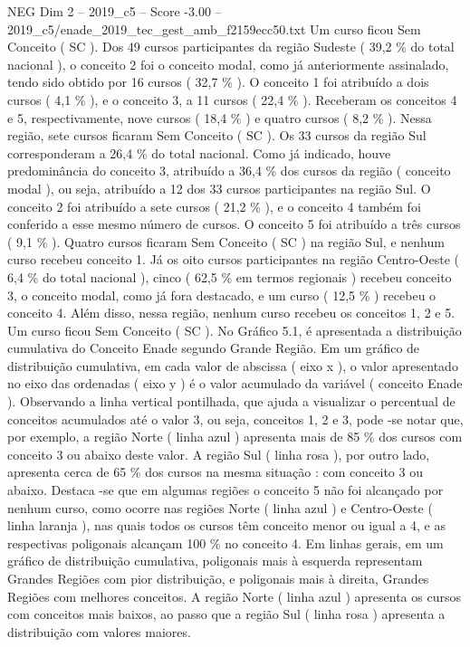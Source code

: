 \begin{textsample}{NEG Dim 2 – 2019\_c5 – Score -3.00 – 2019\_c5/enade\_2019\_tec\_gest\_amb\_f2159ecc50.txt}
Um curso ficou Sem Conceito ( SC ).
Dos 49 cursos participantes da região Sudeste ( 39,2 \% do total nacional ), o conceito 2 foi o conceito modal, como já anteriormente assinalado, tendo sido obtido por 16 cursos ( 32,7 \% ).
O conceito 1 foi atribuído a dois cursos ( 4,1 \% ), e o conceito 3, a 11 cursos ( 22,4 \% ).
Receberam os conceitos 4 e 5, respectivamente, nove cursos ( 18,4 \% ) e quatro cursos ( 8,2 \% ).
Nessa região, sete cursos ficaram Sem Conceito ( SC ).
Os 33 cursos da região Sul corresponderam a 26,4 \% do total nacional.
Como já indicado, houve predominância do conceito 3, atribuído a 36,4 \% dos cursos da região ( conceito modal ), ou seja, atribuído a 12 dos 33 cursos participantes na região Sul.
O conceito 2 foi atribuído a sete cursos ( 21,2 \% ), e o conceito 4 também foi conferido a esse mesmo número de cursos.
O conceito 5 foi atribuído a três cursos ( 9,1 \% ).
Quatro cursos ficaram Sem Conceito ( SC ) na região Sul, e nenhum curso recebeu conceito 1.
Já os oito cursos participantes na região Centro-Oeste ( 6,4 \% do total nacional ), cinco ( 62,5 \% em termos regionais ) recebeu conceito 3, o conceito modal, como já fora destacado, e um curso ( 12,5 \% ) recebeu o conceito 4.
Além disso, nessa região, nenhum curso recebeu os conceitos 1, 2 e 5.
Um curso ficou Sem Conceito ( SC ).
No Gráfico 5.1, é apresentada a distribuição cumulativa do Conceito Enade segundo Grande Região.
Em um gráfico de distribuição cumulativa, em cada valor de abscissa ( eixo x ), o valor apresentado no eixo das ordenadas ( eixo y ) é o valor acumulado da variável ( conceito Enade ).
Observando a linha vertical pontilhada, que ajuda a visualizar o percentual de conceitos acumulados até o valor 3, ou seja, conceitos 1, 2 e 3, pode -se notar que, por exemplo, a região Norte ( linha azul ) apresenta mais de 85 \% dos cursos com conceito 3 ou abaixo deste valor.
A região Sul ( linha rosa ), por outro lado, apresenta cerca de 65 \% dos cursos na mesma situação : com conceito 3 ou abaixo.
Destaca -se que em algumas regiões o conceito 5 não foi alcançado por nenhum curso, como ocorre nas regiões Norte ( linha azul ) e Centro-Oeste ( linha laranja ), nas quais todos os cursos têm conceito menor ou igual a 4, e as respectivas poligonais alcançam 100 \% no conceito 4.
Em linhas gerais, em um gráfico de distribuição cumulativa, poligonais mais à esquerda representam Grandes Regiões com pior distribuição, e poligonais mais à direita, Grandes Regiões com melhores conceitos.
A região Norte ( linha azul ) apresenta os cursos com conceitos mais baixos, ao passo que a região Sul ( linha rosa ) apresenta a distribuição com valores maiores.

\end{textsample}
